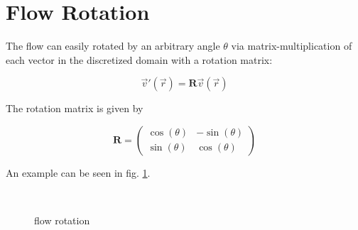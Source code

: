 \documentclass[a4paper,10pt,notitlepage]{scrreprt}
\newcommand{\mat}[1]{\mathbf{#1}}
\begin{document}
\section{Flow Rotation}

The flow can easily rotated by an arbitrary angle $\theta$ via
matrix-multiplication of each vector in the discretized domain with a rotation
matrix:

\begin{equation}
 \vec{v}'(\vec{r}) = \mat{R} \vec{v}(\vec{r})
\end{equation}

The rotation matrix is given by

\begin{equation}
 \mat{R} = \left(
\begin{array}{cc}
\cos(\theta) & -\sin(\theta) \\
\sin(\theta) & \cos(\theta) \end{array} \right)
\end{equation}

An example can be seen in fig. \ref{fig:flow-rotation}.

\begin{figure}
  \centering
  \\
  \caption{flow rotation}
  \label{fig:flow-rotation}
\end{figure}
\end{document}
